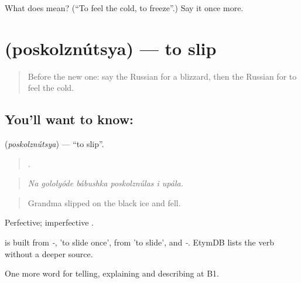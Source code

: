 \begin{tcolorbox}[breakable,colback=teal!4,colframe=teal!35!black,title={Before you move on}]
What does  mean? (\textquotedblleft{}To feel the cold, to freeze\textquotedblright{}.) Say it once more.
\end{tcolorbox}
\section[\texorpdfstring{\ru{поскользнуться} (poskolznútsya)}{поскользнуться (poskolznútsya)}]{ (poskolznútsya) — to slip}

\label{lesson:RU-C467-poskolznutsya}



\begin{quote}
Before the new one: say the Russian for a blizzard, then the Russian for to feel the cold.
\end{quote}

\subsection*{You'll want to know: }
\textbf{} (\emph{poskolznútsya}) — \textquotedblleft{}to slip\textquotedblright{}.

\begin{quote}
     .
\end{quote}

\begin{quote}
\emph{Na gololyóde bábushka poskolznúlas i upála.}
\end{quote}

\begin{quote}
Grandma slipped on the black ice and fell.
\end{quote}

Perfective; imperfective \emph{}.

\begin{cousinweb}
\emph{} is built from \emph{-}, \emph{} 'to slide once', from \emph{} 'to slide', and \emph{-}. EtymDB lists the verb without a deeper source.
\end{cousinweb}

\begin{grammarlens}[title={What you've built}]
One more word for telling, explaining and describing at B1.
\end{grammarlens}

